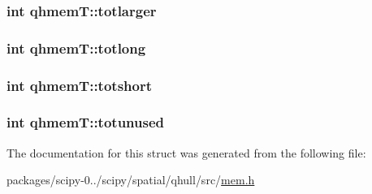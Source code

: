\subsubsection[{totlarger}]{\setlength{\rightskip}{0pt plus 5cm}int qhmem\+T\+::totlarger}\label{structqhmemT_a68bb78557734b8372001fd156f0d0e3f}
\hypertarget{structqhmemT_a097b5568566b48c758696f687354fe12}{}
\subsubsection[{totlong}]{\setlength{\rightskip}{0pt plus 5cm}int qhmem\+T\+::totlong}\label{structqhmemT_a097b5568566b48c758696f687354fe12}
\hypertarget{structqhmemT_a74d8c7d5fd8ae4260d3c16ebef3f244f}{}
\subsubsection[{totshort}]{\setlength{\rightskip}{0pt plus 5cm}int qhmem\+T\+::totshort}\label{structqhmemT_a74d8c7d5fd8ae4260d3c16ebef3f244f}
\hypertarget{structqhmemT_aed75384a5dd4e977cc47751f5353b3a9}{}
\subsubsection[{totunused}]{\setlength{\rightskip}{0pt plus 5cm}int qhmem\+T\+::totunused}\label{structqhmemT_aed75384a5dd4e977cc47751f5353b3a9}


The documentation for this struct was generated from the following file\+:\begin{DoxyCompactItemize}
\item 
packages/scipy-\/0../scipy/spatial/qhull/src/\hyperlink{mem_8h}{mem.\+h}\end{DoxyCompactItemize}

